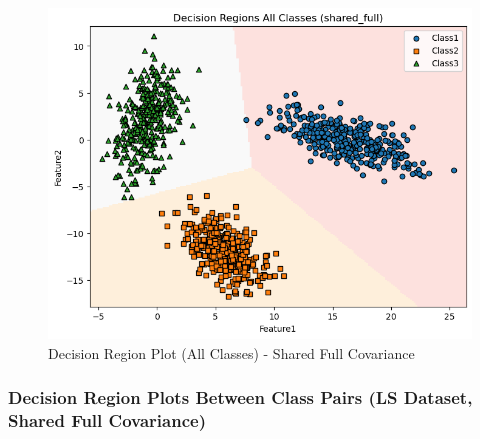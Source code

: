 \begin{figure}[H]
    \centering
    \includegraphics[width=\linewidth]{images/LS_Group04_images/02_shared_full/05_decision_region_all.png}
    \caption{Decision Region Plot (All Classes) - Shared Full Covariance}
\end{figure}

\subsubsection{Decision Region Plots Between Class Pairs (LS Dataset, Shared Full Covariance)}


